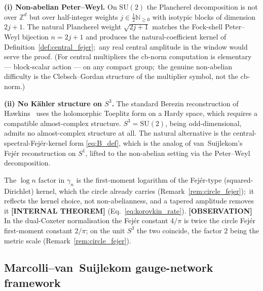 \documentclass[11pt,a4paper]{article}
\theoremstyle{plain}
\theoremstyle{definition}
\newcommand{\sthree}{S^{3}}
\newcommand{\N}{\mathbb{N}}
\newcommand{\Z}{\mathbb{Z}}
\newcommand{\SU}{\mathrm{SU}}
\begin{document}
\textbf{(i) Non-abelian Peter--Weyl.} On $\SU(2)$ the Plancherel
decomposition is not over $\Z^d$ but over half-integer weights
$j \in \tfrac{1}{2}\N_{\ge 0}$ with isotypic blocks of dimension
$2j+1$. The natural Plancherel weight $\sqrt{2j+1}$ matches the
Fock-shell Peter--Weyl bijection $n = 2j+1$ and produces the
natural-coefficient kernel of Definition~\ref{def:central_fejer};\ any
real central amplitude in the window would serve the proof. (For central multipliers the
cb-norm computation is elementary — block-scalar action — on any
compact group;\ the genuine non-abelian difficulty is the
Clebsch--Gordan structure of the multiplier symbol, not the cb-norm.)

\textbf{(ii) No K\"ahler structure on $\sthree$.} The standard Berezin
reconstruction of Hawkins~\cite{hawkins2000} uses the holomorphic
Toeplitz form on a Hardy space, which requires a compatible
almost-complex structure. $\sthree = \SU(2)$, being odd-dimensional,
admits no almost-complex structure at all. The natural alternative
is the central-spectral-Fej\'er-kernel form
\eqref{eq:B_def}, which is the analog
of van~Suijlekom's~\cite{vs2021_jgp} Fej\'er
reconstruction on $S^1$, lifted to the non-abelian setting via the
Peter--Weyl decomposition.

The $\log n$ factor in $\gamma_n$ is the first-moment logarithm of the
Fej\'er-type (squared-Dirichlet) kernel, which the circle already carries
(Remark~\ref{rem:circle_fejer});\ it reflects the kernel choice, not
non-abelianness, and a tapered amplitude removes it \textbf{[INTERNAL THEOREM]}
(Eq.~\eqref{eq:korovkin_rate}). \textbf{[OBSERVATION]} In the
dual-Coxeter normalisation the Fej\'er constant $4/\pi$ is twice the
circle Fej\'er first-moment constant $2/\pi$; on the unit $\sthree$ the
two coincide, the factor $2$ being the metric scale
(Remark~\ref{rem:circle_fejer}).

\subsection{Marcolli--van~Suijlekom gauge-network framework}
\label{sec:marcolli_vs}
\end{document}
